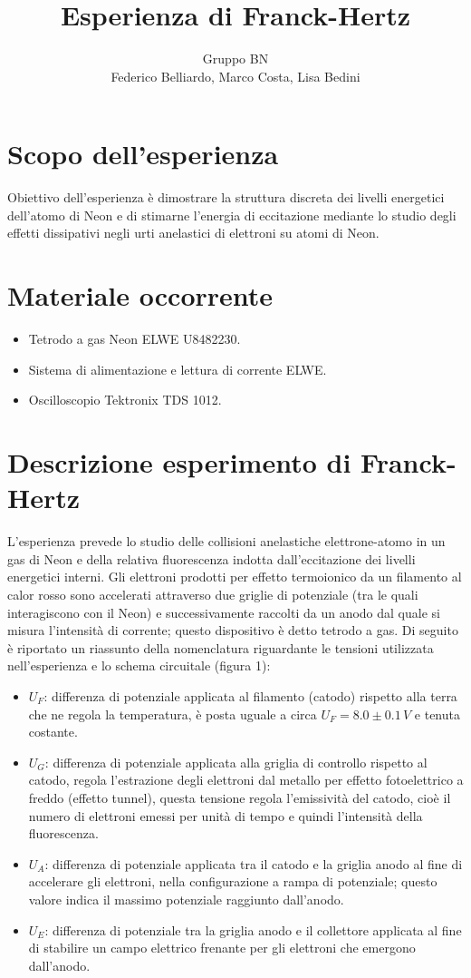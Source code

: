 \documentclass[10pt,a4paper]{article}
\author{Gruppo BN \\ Federico Belliardo, Marco Costa, Lisa Bedini}
\title{Esperienza di Franck-Hertz}
\begin{document}
\maketitle
\section{Scopo dell'esperienza}
Obiettivo dell'esperienza è dimostrare la struttura discreta dei livelli energetici dell'atomo di Neon e di stimarne l'energia di eccitazione mediante lo studio degli effetti dissipativi negli urti anelastici di elettroni su atomi di Neon.\\

\section{Materiale occorrente}
\begin{itemize}
\item Tetrodo a gas Neon ELWE U8482230.
\item Sistema di alimentazione e lettura di corrente ELWE.
\item Oscilloscopio Tektronix TDS 1012.
\end{itemize}

\section{Descrizione esperimento di Franck-Hertz}
L'esperienza prevede lo studio delle collisioni anelastiche elettrone-atomo in un gas di Neon e della relativa fluorescenza indotta dall'eccitazione dei livelli energetici interni. Gli elettroni prodotti per effetto termoionico da un filamento al calor rosso sono accelerati attraverso due griglie di potenziale (tra le quali interagiscono con il Neon) e successivamente raccolti da un anodo dal quale si misura l'intensità di corrente; questo dispositivo è detto tetrodo a gas.
Di seguito è riportato un riassunto della nomenclatura riguardante le tensioni utilizzata nell'esperienza e lo schema circuitale (figura 1):

\begin{itemize}
\item $U_F$: differenza di potenziale applicata al filamento (catodo) rispetto alla terra che ne regola la temperatura, è posta uguale a circa $U_F = 8.0\pm0.1 \,V$ e tenuta costante.
\item $U_G$: differenza di potenziale applicata alla griglia di controllo rispetto al catodo, regola l'estrazione degli elettroni dal metallo per effetto fotoelettrico a freddo (effetto tunnel), questa tensione regola l'emissività del catodo, cioè il numero di elettroni emessi per unità di tempo e quindi l'intensità della fluorescenza.
\item $U_A$: differenza di potenziale applicata tra il catodo e la griglia anodo al fine di accelerare gli elettroni, nella configurazione a rampa di potenziale; questo valore indica il massimo potenziale raggiunto dall'anodo.
\item $U_E$: differenza di potenziale tra la griglia anodo e il collettore applicata al fine di stabilire un campo elettrico frenante per gli elettroni che emergono dall'anodo.
\end{itemize}
\end{document}
